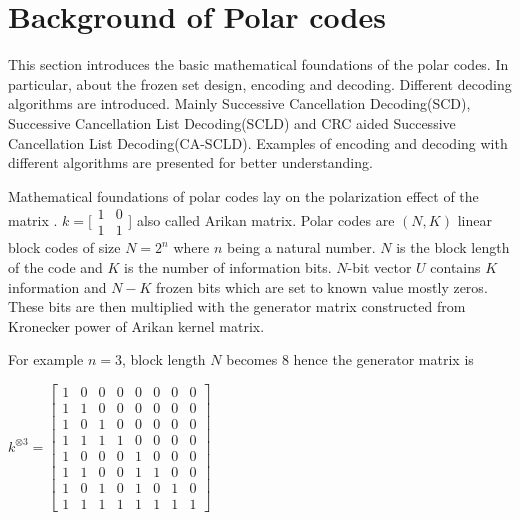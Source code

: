 \section{Background of Polar codes} 
This section introduces the basic mathematical foundations of the polar codes. In particular, about the frozen set design, encoding and decoding. Different decoding algorithms are introduced. Mainly Successive Cancellation Decoding(SCD), Successive Cancellation List Decoding(SCLD) and CRC aided Successive Cancellation List Decoding(CA-SCLD). Examples of encoding and decoding with different algorithms are presented for better understanding.


Mathematical foundations of polar codes lay on the polarization effect of the matrix \cite{Arikan}. $ k = \big[\begin{smallmatrix} 1 & 0 \\ 1 & 1 \end{smallmatrix}$\big] also called Arikan matrix. Polar codes are $(N,K)$ linear block codes of size $N = 2^{n}$ where $n$ being a natural number. $N$ is the block length of the code and $K$ is the number of information bits.  $N$-bit vector $U$ contains $K$ information and $N-K$ frozen bits which are set to known value mostly zeros. These bits are then multiplied with the generator matrix constructed from Kronecker power of Arikan kernel matrix.

For example $n=3$, block length $N$ becomes $8$ hence the generator matrix is \newline

$ k^{\otimes 3} = \begin{bmatrix}
1 & 0 & 0 & 0 & 0 & 0 & 0 & 0\\ 
1 & 1 & 0 & 0 & 0 & 0 & 0 & 0\\ 
1 & 0 & 1 & 0 & 0 & 0 & 0 & 0\\ 
1 & 1 & 1 & 1 & 0 & 0 & 0 & 0\\ 
1 & 0 & 0 & 0 & 1 & 0 & 0 & 0\\ 
1 & 1 & 0 & 0 & 1 & 1 & 0 & 0\\ 
1 & 0 & 1 & 0 & 1 & 0 & 1 & 0\\ 
1 & 1 & 1 & 1 & 1 & 1 & 1 & 1
\end{bmatrix}$ \newline

